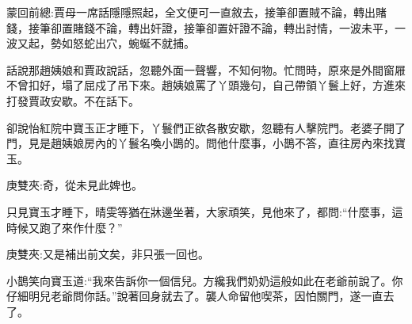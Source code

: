 

\begin{parag}
    \begin{note}蒙回前總:賈母一席話隱隱照起，全文便可一直敘去，接筆卻置賊不論，轉出賭錢，接筆卻置賭錢不論，轉出奸證，接筆卻置奸證不論，轉出討情，一波未平，一波又起，勢如怒蛇出穴，蜿蜒不就捕。\end{note}
\end{parag}


\begin{parag}
    話說那趙姨娘和賈政說話，忽聽外面一聲響，不知何物。忙問時，原來是外間窗屜不曾扣好，塌了屈戍了吊下來。趙姨娘罵了丫頭幾句，自己帶領丫鬟上好，方進來打發賈政安歇。不在話下。
\end{parag}


\begin{parag}
    卻說怡紅院中寶玉正才睡下，丫鬟們正欲各散安歇，忽聽有人擊院門。老婆子開了門，見是趙姨娘房內的丫鬟名喚小鵲的。問他什麼事，小鵲不答，直往房內來找寶玉。\begin{note}庚雙夾:奇，從未見此婢也。\end{note}只見寶玉才睡下，晴雯等猶在牀邊坐著，大家頑笑，見他來了，都問:“什麼事，這時候又跑了來作什麼？”\begin{note}庚雙夾:又是補出前文矣，非只張一回也。\end{note}小鵲笑向寶玉道:“我來告訴你一個信兒。方纔我們奶奶這般如此在老爺前說了。你仔細明兒老爺問你話。”說著回身就去了。襲人命留他喫茶，因怕關門，遂一直去了。
\end{parag}


